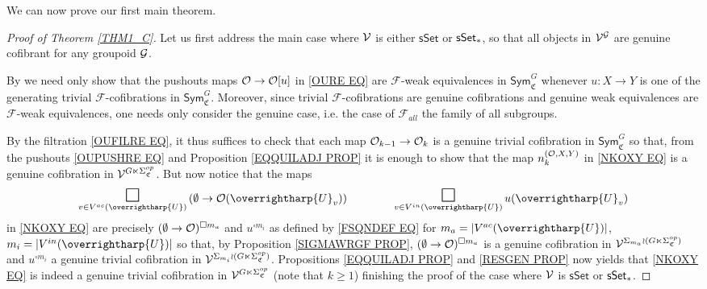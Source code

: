 \documentclass[a4paper,10pt
,draft
]{article}%
\renewcommand{\F}{\mathcal F}
\renewcommand{\1}{\eta}%
\newcommand{\vect}[1]{\text{\overrightharp{\ensuremath{#1}}}}
\begin{document}
We can now prove our first main theorem.

\begin{proof}[Proof of Theorem \ref{THM1_C}]
Let us first address the main case where $\mathcal V$
is either $\mathsf{sSet}$ or $\mathsf{sSet}_{\**}$, 
so that all objects in $\mathcal V^{\mathcal{G}}$ are genuine cofibrant for any groupoid $\mathcal{G}$.

By \cite[Thm. 11.3.2]{Hir03} we need only show that
the pushouts maps $\mathcal{O} \to \mathcal{O}[u]$ in \eqref{OURE EQ}
are $\F$-weak equivalences in $\mathsf{Sym}^G_{\mathfrak{C}}$
whenever 
$u \colon X \to Y$
is one of the generating trivial $\F$-cofibrations in 
$\mathsf{Sym}^G_{\mathfrak{C}}$.
Moreover, since trivial $\F$-cofibrations are genuine cofibrations and 
genuine weak equivalences are $\F$-weak equivalences, one needs only consider the genuine case, i.e. the case of $\F_{all}$ the family of all subgroups.

By the filtration \eqref{OUFILRE EQ}, it thus suffices to check that each map $\mathcal{O}_{k-1} \to \mathcal{O}_k$
is a genuine trivial cofibration in $\mathsf{Sym}^G_{\mathfrak{C}}$
so that, from the pushouts \eqref{OUPUSHRE EQ}
and Proposition \ref{EQQUILADJ PROP}
it is enough to show that the map
$n_k^{(\mathcal{O},X,Y)}$ in \eqref{NKOXY EQ}
is a genuine cofibration in $\mathcal V^{G \ltimes \Sigma_{\mathfrak{C}}^{op}}$.
But now notice that the maps
\[
\mathop{\mathlarger{\mathlarger{\mathlarger{\square}}}}\limits_{v \in V^{ac}(\vect{U})} \left( \emptyset \to \O(\vect{U}_v)\right) 
\qquad \qquad
\mathop{\mathlarger{\mathlarger{\mathlarger{\square}}}}\limits_{v \in V^{in}(\vect{U})} u(\vect{U}_v)
\]
in \eqref{NKOXY EQ} are precisely 
$(\emptyset \to \mathcal{O})^{\square m_a}$ and 
$u^{\square m_i}$ 
as defined by \eqref{FSQNDEF EQ} for
$m_a = |V^{ac}(\vect U)|$,
$m_i = |V^{in}(\vect U)|$
so that, by Proposition \ref{SIGMAWRGF PROP},
$(\emptyset \to \mathcal{O})^{\square m_a}$ is a 
genuine cofibration in
$\mathcal V^{\Sigma_{m_a} \wr (G \ltimes \Sigma_{\mathfrak{C}}^{op})}$ and
$u^{\square m_i}$ a
genuine trivial cofibration in 
$\mathcal V^{\Sigma_{m_i} \wr (G \ltimes \Sigma_{\mathfrak{C}}^{op})}$.
Propositions \ref{EQQUILADJ PROP} and \ref{RESGEN PROP}
now yields that \eqref{NKOXY EQ} is indeed a genuine trivial cofibration in $\mathcal V^{G \ltimes \Sigma_{\mathfrak{C}}^{op}}$
(note that $k \geq 1$)
finishing the proof of the 
case where $\mathcal V$ is $\mathsf{sSet}$ or $\mathsf{sSet}_{\**}$.




\end{proof}
\end{document}
